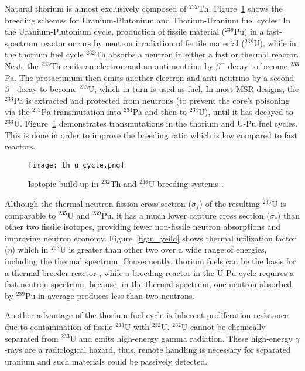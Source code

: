 Natural thorium is almost exclusively composed of $^{232}$Th. Figure~\ref{fig:th_cycle} shows the breeding schemes for Uranium-Plutonium and Thorium-Uranium fuel cycles. In the Uranium-Plutonium cycle, production of fissile material ($^{239}$Pu) in a fast-spectrum reactor occurs by neutron irradiation of fertile material ($^{238}$U), while in the thorium fuel cycle $^{232}$Th absorbs a neutron in either a fast or thermal reactor. Next, the $^{233}$Th emits an electron and an anti-neutrino by $\beta^-$ decay to become $^{233}$Pa. The protactinium then emits another electron and anti-neutrino by a second $\beta^-$ decay to become $^{233}$U, which in turn is used as fuel. In most \gls{MSR} designs, the $^{233}$Pa is extracted and protected from neutrons (to prevent the core's poisoning via the $^{233}$Pa transmutation into $^{234}$Pa and then to $^{234}$U), until it has decayed to $^{233}$U. Figure~\ref{fig:th_cycle} demonstrates transmutations in the thorium and U-Pu fuel cycles. This is done in order to improve the breeding ratio which is low compared to fast reactors. 

\begin{figure}[t] %
  \centering
  \vspace{-0.3em}
  \texttt{[image: th\_u\_cycle.png]}
  \caption{Isotopic build-up in $^{232}$Th and $^{238}$U breeding systems \cite{eschbach_possible_1966}.}
  \vspace{-0.6em}
  \label{fig:th_cycle}
\end{figure}
\FloatBarrier

Although the thermal neutron fission cross section ($\sigma_f$) of the resulting $^{233}$U is comparable to $^{235}$U and $^{239}$Pu, it has a much lower capture cross section ($\sigma_c$) than other two fissile isotopes, providing fewer non-fissile neutron absorptions and improving neutron economy. Figure~\ref{fig:n_yeild} shows thermal utilization factor ($\eta$) which in $^{233}$U is greater than other two over a wide range of energies, including the thermal spectrum. Consequently, thorium fuels can be the basis for a thermal breeder reactor \cite{iaea_thorium_2005}, while a breeding reactor in the U-Pu cycle requires a fast neutron spectrum, because, in the thermal spectrum, one neutron absorbed by $^{239}$Pu in average produces less than two neutrons.

Another advantage of the thorium fuel cycle is inherent proliferation resistance due to contamination of fissile $^{233}$U with $^{232}$U. $^{232}$U cannot be chemically separated from $^{233}$U and  emits high-energy gamma radiation. These high-energy $\gamma$-rays are a radiological hazard, thus, remote handling is necessary for separated uranium and such materials could be passively detected.

